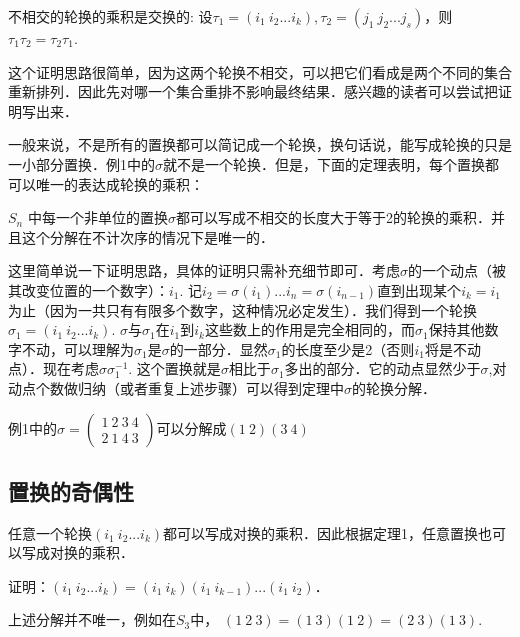 \begin{lemma}{}
不相交的轮换的乘积是交换的: 设$\tau_1=(i_1\ i_2...i_k), \tau_2=(j_1\ j_2...j_s)$，则$\tau_1\tau_2=\tau_2\tau_1$.
\end{lemma}
这个证明思路很简单，因为这两个轮换不相交，可以把它们看成是两个不同的集合重新排列．因此先对哪一个集合重排不影响最终结果．感兴趣的读者可以尝试把证明写出来．

一般来说，不是所有的置换都可以简记成一个轮换，换句话说，能写成轮换的只是一小部分置换．例1中的$\sigma$就不是一个轮换．但是，下面的定理表明，每个置换都可以唯一的表达成轮换的乘积：
\begin{theorem}{}
$S_n$ 中每一个非单位的置换$\sigma$都可以写成不相交的长度大于等于2的轮换的乘积．并且这个分解在不计次序的情况下是唯一的．
\end{theorem}
这里简单说一下证明思路，具体的证明只需补充细节即可．考虑$\sigma$的一个动点（被其改变位置的一个数字）：$i_1$. 记$i_2=\sigma(i_1)...i_n=\sigma(i_{n-1})$直到出现某个$i_k=i_1$为止（因为一共只有有限多个数字，这种情况必定发生）．我们得到一个轮换$\sigma_1=(i_1\ i_2...i_k)$. $\sigma$与$\sigma_1$在$i_1$到$i_k$这些数上的作用是完全相同的，而$\sigma_1$保持其他数字不动，可以理解为$\sigma_1$是$\sigma$的一部分．显然$\sigma_1$的长度至少是2（否则$i_1$将是不动点）．现在考虑$\sigma\sigma_1^{-1}$. 这个置换就是$\sigma$相比于$\sigma_1$多出的部分．它的动点显然少于$\sigma$,对动点个数做归纳（或者重复上述步骤）可以得到定理中$\sigma$的轮换分解．

\begin{example}{}
例1中的$\sigma=\begin{pmatrix}
1\ 2\ 3\ 4\\ 2\ 1\ 4\ 3
\end{pmatrix}$可以分解成$(1\ 2)(3\ 4)$
\end{example}

\subsection{置换的奇偶性}

\begin{lemma}{}
任意一个轮换$(i_1\ i_2...i_k)$都可以写成对换的乘积．因此根据定理1，任意置换也可以写成对换的乘积．
\end{lemma}
证明：$(i_1\ i_2...i_k)=(i_1\ i_k)(i_1\ i_{k-1})...(i_1\ i_2)$．

\begin{example}{}
上述分解并不唯一，例如在$S_3$中，
$(1\ 2\ 3)=(1\ 3)(1\ 2)=(2\ 3)(1\ 3)$.
\end{example}

